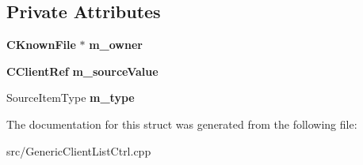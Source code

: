 \subsection*{Private Attributes}
\begin{DoxyCompactItemize}
\item 
{\bf CKnownFile} $\ast$ {\bfseries m\_\-owner}\label{structClientCtrlItem__Struct_a87bd40b7fa410c2c5c5eabbc34c8ba45}

\item 
{\bf CClientRef} {\bfseries m\_\-sourceValue}\label{structClientCtrlItem__Struct_ab20f88ce72ebd471ecb4387e5758596d}

\item 
SourceItemType {\bfseries m\_\-type}\label{structClientCtrlItem__Struct_a7db87c983b9ae085bab7d4501e4a10d4}

\end{DoxyCompactItemize}


The documentation for this struct was generated from the following file:\begin{DoxyCompactItemize}
\item 
src/GenericClientListCtrl.cpp\end{DoxyCompactItemize}
